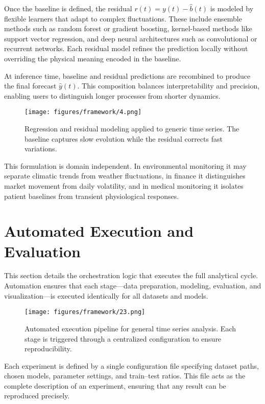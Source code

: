Once the baseline is defined, the residual $r(t)=y(t)-\hat{b}(t)$ is modeled by flexible learners that adapt to complex fluctuations. These include ensemble methods such as random forest or gradient boosting, kernel-based methods like support vector regression, and deep neural architectures such as convolutional or recurrent networks. Each residual model refines the prediction locally without overriding the physical meaning encoded in the baseline.

At inference time, baseline and residual predictions are recombined to produce the final forecast $\hat{y}(t)$. This composition balances interpretability and precision, enabling users to distinguish longer processes from shorter dynamics.

\begin{figure}[htbp]
\centering
\texttt{[image: figures/framework/4.png]}
\caption{Regression and residual modeling applied to generic time series. The baseline captures slow evolution while the residual corrects fast variations.}
\label{fig:baseline_residual_general}
\end{figure}

This formulation is domain independent. In environmental monitoring it may separate climatic trends from weather fluctuations, in finance it distinguishes market movement from daily volatility, and in medical monitoring it isolates patient baselines from transient physiological responses. 

\section{Automated Execution and Evaluation}

This section details the orchestration logic that executes the full analytical cycle. Automation ensures that each stage—data preparation, modeling, evaluation, and visualization—is executed identically for all datasets and models.

\begin{figure}[htbp]
\centering
\texttt{[image: figures/framework/23.png]}
\caption{Automated execution pipeline for general time series analysis. Each stage is triggered through a centralized configuration to ensure reproducibility.}
\label{fig:automation_general}
\end{figure}

Each experiment is defined by a single configuration file specifying dataset paths, chosen models, parameter settings, and train–test ratios. This file acts as the complete description of an experiment, ensuring that any result can be reproduced precisely.

